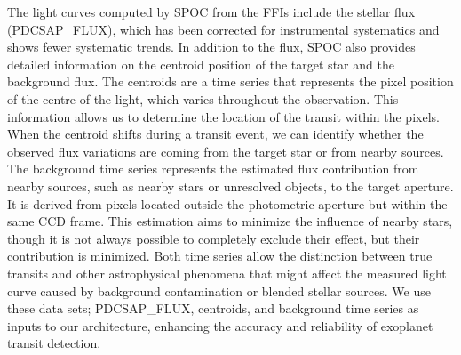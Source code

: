 The light curves computed by SPOC from the FFIs include the stellar flux (PDCSAP\_FLUX), which has been corrected for instrumental systematics and shows fewer systematic trends. In addition to the flux, SPOC also provides detailed information on the centroid position of the target star and the background flux. The centroids are a time series that represents the pixel position of the centre of the light, which varies throughout the observation. This information allows us to determine the location of the transit within the pixels. When the centroid shifts during a transit event, we can identify whether the observed flux variations are coming from the target star or from nearby sources. The background time series represents the estimated flux contribution from nearby sources, such as nearby stars or unresolved objects, to the target aperture. It is derived from pixels located outside the photometric aperture but within the same CCD frame. This estimation aims to minimize the influence of nearby stars, though it is not always possible to completely exclude their effect, but their contribution is minimized. Both time series allow the distinction between true transits and other astrophysical phenomena that might affect the measured light curve caused by background contamination or blended stellar sources. We use these data sets; PDCSAP\_FLUX, centroids, and background time series as inputs to our architecture, enhancing the accuracy and reliability of exoplanet transit detection. \par

